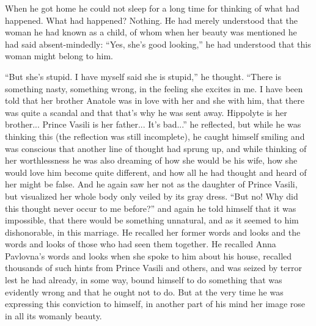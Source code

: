 When he got home he could not sleep for a long time for thinking
of what had happened. What had happened? Nothing. He had merely
understood that the woman he had known as a child, of whom when
her beauty was mentioned he had said absent-mindedly: ``Yes,
she's good looking,'' he had understood that this woman might
belong to him.

``But she's stupid. I have myself said she is stupid,'' he
thought. ``There is something nasty, something wrong, in the
feeling she excites in me. I have been told that her brother
Anatole was in love with her and she with him, that there was
quite a scandal and that that's why he was sent away. Hippolyte
is her brother... Prince Vasili is her father... It's bad...'' he
reflected, but while he was thinking this (the reflection was
still incomplete), he caught himself smiling and was conscious
that another line of thought had sprung up, and while thinking of
her worthlessness he was also dreaming of how she would be his
wife, how she would love him become quite different, and how all
he had thought and heard of her might be false. And he again saw
her not as the daughter of Prince Vasili, but visualized her
whole body only veiled by its gray dress. ``But no! Why did this
thought never occur to me before?'' and again he told himself
that it was impossible, that there would be something unnatural,
and as it seemed to him dishonorable, in this marriage. He
recalled her former words and looks and the words and looks of
those who had seen them together. He recalled Anna Pavlovna's
words and looks when she spoke to him about his house, recalled
thousands of such hints from Prince Vasili and others, and was
seized by terror lest he had already, in some way, bound himself
to do something that was evidently wrong and that he ought not to
do. But at the very time he was expressing this conviction to
himself, in another part of his mind her image rose in all its
womanly beauty.


